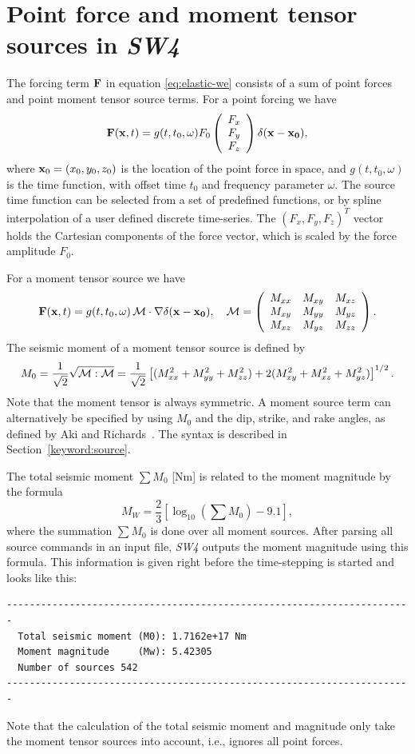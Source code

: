 \documentclass[11pt]{report}
\begin{document}
\section{Point force and moment tensor sources in \emph{SW4}}\label{sec:time-functions}
The forcing term ${\bf F}$ in equation \eqref{eq:elastic-we} consists of a sum of point forces and
point moment tensor source terms. For a point forcing we have
\[
	{\bf F}({\bf x},t) = g(t,t_0,\omega) F_0 \left(\begin{array}{c}
			F_x \\ F_y\\ F_z\end{array}\right) \delta ({\bf x} - {\bf x_0}),
\]
where ${\bf x}_0=(x_0,y_0,z_0)$ is the location of the point force in space, and $g(t,t_0,\omega)$
is the time function, with offset time $t_0$ and frequency parameter $\omega$. The source time
function can be selected from a set of predefined functions, or by spline interpolation of a user
defined discrete time-series. The $(F_x,F_y,F_z)^T$ vector holds the Cartesian components of the force
vector, which is scaled by the force amplitude $F_0$.

For a moment tensor source we have
\[
	{\bf F}({\bf x},t) = g(t,t_0,\omega)\, {\cal  M} \cdot \nabla \delta ({\bf x} - {\bf
		x_0}), \quad
	{\cal M} = \left(\begin{array}{ccc}
			M_{xx} & M_{xy} & M_{xz} \\
			M_{xy} & M_{yy} & M_{yz} \\
			M_{xz} & M_{yz} & M_{zz}
		\end{array}
	\right).
\]
The seismic moment of a moment tensor source is defined by
\[
	M_0 = \frac{1}{\sqrt{2}}\sqrt{{\cal M}:{\cal M}} = \frac{1}{\sqrt{2}}\left[ (M_{xx}^2 + M_{yy}^2 + M_{zz}^2 ) + 2
		(M_{xy}^2 + M_{xz}^2 + M_{yz}^2) \right]^{1/2}.
\]
Note that the moment tensor is always symmetric. A moment source term can alternatively be specified
by using $M_0$ and the dip, strike, and rake angles, as defined by Aki and
Richards~\cite{Aki-Richards-02}. The syntax is described in Section~\ref{keyword:source}.

The total seismic moment $\sum M_0$ [Nm] is related to the moment magnitude by the formula
\[
	M_W = \frac{2}{3}\left[\log_{10}\left(\sum M_0\right) - 9.1\right],
\]
where the summation $\sum M_0$ is done over all moment sources.
After parsing all source commands in an input file, \emph{SW4} outputs the moment magnitude using
this formula. This information is given right before the time-stepping is started and looks like this:
\begin{verbatim}
-----------------------------------------------------------------------
  Total seismic moment (M0): 1.7162e+17 Nm 
  Moment magnitude     (Mw): 5.42305
  Number of sources 542
-----------------------------------------------------------------------
\end{verbatim}
Note that the calculation of the total seismic moment and magnitude only take the moment tensor sources into
account, i.e., ignores all point forces.
\end{document}
